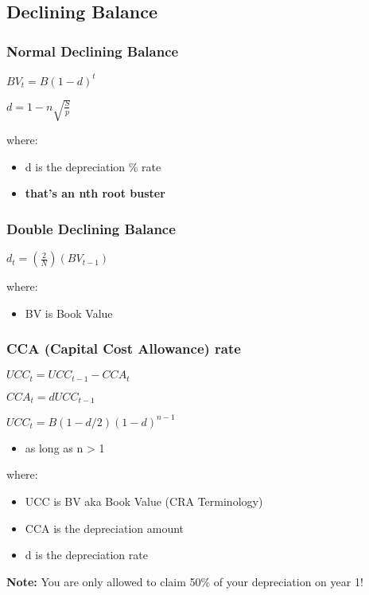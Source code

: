 \documentclass[]{article}
\providecommand{\tightlist}{%
  \setlength{\itemsep}{0pt}\setlength{\parskip}{0pt}}
\begin{document}
\hypertarget{declining-balance}{%
\subsection{Declining Balance}\label{declining-balance}}

\hypertarget{normal-declining-balance}{%
\subsubsection{Normal Declining
Balance}\label{normal-declining-balance}}

\(BV_{t} = B(1-d)^{t}\)

\(d = 1-n\sqrt{\frac{S}{p}}\)

where:

\begin{itemize}
\tightlist
\item
  d is the depreciation \% rate
\item
  \textbf{that's an nth root buster}
\end{itemize}

\hypertarget{double-declining-balance}{%
\subsubsection{Double Declining
Balance}\label{double-declining-balance}}

\(d_{t}=(\frac{2}{N})(BV_{t-1})\)

where:

\begin{itemize}
\tightlist
\item
  BV is Book Value
\end{itemize}

\hypertarget{cca-capital-cost-allowance-rate}{%
\subsubsection{CCA (Capital Cost Allowance)
rate}\label{cca-capital-cost-allowance-rate}}

\(UCC_{t}=UCC_{t-1}-CCA_{t}\)

\(CCA_{t}=dUCC_{t-1}\)

\(UCC_{t}=B(1-d/2)(1-d)^{n-1}\)

\begin{itemize}
\tightlist
\item
  as long as n \textgreater{} 1
\end{itemize}

where:

\begin{itemize}
\tightlist
\item
  UCC is BV aka Book Value (CRA Terminology)
\item
  CCA is the depreciation amount
\item
  d is the depreciation rate
\end{itemize}

\textbf{Note:} You are only allowed to claim 50\% of your depreciation
on year 1!
\end{document}
